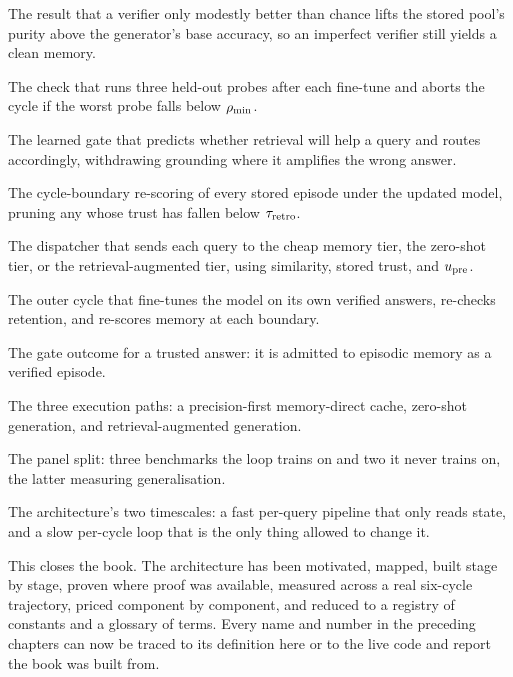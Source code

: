 \begin{description}[leftmargin=0pt, labelsep=0.6em, style=nextline]
\item[Purity theorem] The result that a verifier only modestly better than chance lifts
the stored pool's purity above the generator's base accuracy, so an imperfect verifier
still yields a clean memory.

\item[Retention guard] The check that runs three held-out probes after each fine-tune and
aborts the cycle if the worst probe falls below $\rho_{\min}$.

\item[Retrieval-utility classifier (RUC)] The learned gate that predicts whether retrieval
will help a query and routes accordingly, withdrawing grounding where it amplifies the
wrong answer.

\item[Retroverification] The cycle-boundary re-scoring of every stored episode under the
updated model, pruning any whose trust has fallen below $\tau_{\text{retro}}$.

\item[Router] The dispatcher that sends each query to the cheap memory tier, the zero-shot
tier, or the retrieval-augmented tier, using similarity, stored trust, and $u_{\text{pre}}$.

\item[Self-improvement loop] The outer cycle that fine-tunes the model on its own verified
answers, re-checks retention, and re-scores memory at each boundary.

\item[Store] The gate outcome for a trusted answer: it is admitted to episodic memory as a
verified episode.

\item[Tier 1 / Tier 2 / Tier 3] The three execution paths: a precision-first memory-direct
cache, zero-shot generation, and retrieval-augmented generation.

\item[Training versus transfer] The panel split: three benchmarks the loop trains on and
two it never trains on, the latter measuring generalisation.

\item[Two clocks] The architecture's two timescales: a fast per-query pipeline that only
reads state, and a slow per-cycle loop that is the only thing allowed to change it.

\end{description}

This closes the book. The architecture has been motivated, mapped, built stage by
stage, proven where proof was available, measured across a real six-cycle trajectory,
priced component by component, and reduced to a registry of constants and a glossary of
terms. Every name and number in the preceding chapters can now be traced to its
definition here or to the live code and report the book was built from.
